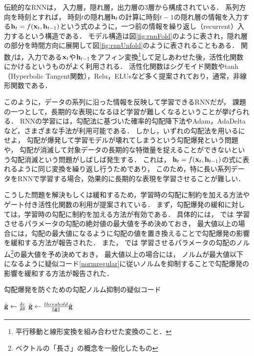 伝統的なRNNは，
入力層，隠れ層，出力層の3層から構成されている．
系列方向を時刻とすれば，
時刻$t$の隠れ層${\bf h}_t$の計算に時刻$t-1$の隠れ層の情報を入力する${\bf h}_t = f({\bf x}_t, {\bf h}_{t-1})$という式のように，一つ前の情報を繰り返し（recurrent）入力するという構造である．
モデル構造は図\ref{fig:rnnFold}のように表され，隠れ層の部分を時間方向に展開して図\ref{fig:rnnUnfold}のように表されることもある．
関数$f$は，入力である${\bf x}_t$や${\bf h}_{t-1}$をアフィン変換\footnote{平行移動と線形変換を組み合わせた変換のこと．}して足しあわせた後，活性化関数にかけるというものがよく利用される．
活性化関数はシグモイド関数やtanh（Hyperbolic Tangent関数），Relu\cite{nair2010rectified}，ELUs\cite{clevert2015fast}など多く提案されており，通常，非線形関数である．



このように，データの系列に沿った情報を反映して学習できるRNNだが，
課題の一つとして，長期的な表現になるほど学習が難しくなるということが挙げられる\cite{bengio1994learning}．
RNNの学習には，勾配法に基づいた確率的勾配降下法\cite{robbins1951stochastic,kushner2003stochastic}やAdam\cite{kingma2014adam}，AdaDelta\cite{zeiler2012adadelta}など，さまざまな手法が利用可能である．
しかし，いずれの勾配法を用いるにせよ，
勾配が爆発して学習モデルが壊れてしまうという勾配爆発\cite{bengio1994learning,pascanu2013difficulty}という問題や，
勾配が消滅して対象データの長期的な特徴量を捉えることができないという勾配消滅\cite{pascanu2013difficulty, hochreiter1998vanishing}という問題がしばしば発生する．
これは，
${\bf h}_t = f({\bf x}_t, {\bf h}_{t-1})$の式に表れるように同じ変換を繰り返し行うためであり，
このため，特に長い系列データをRNNで学習する場合，効果的に長期的な表現を学習させることが難しい．


こうした問題を解決もしくは緩和するため，学習時の勾配に制約を加える方法やゲート付き活性化関数の利用が提案されている．
まず，勾配爆発の緩和に対しては，学習時の勾配に制約を加える方法が有効である．
具体的には，
\cite{mikolov2012statistical}では
学習させるパラメータの勾配の絶対値の最大値を予め決めておき，
最大値以上の場合には，勾配の最大値になるように勾配の値を置き換えることで勾配爆発の影響を緩和する方法が報告された．
また，
\cite{pascanu2013difficulty}では
学習させるパラメータの勾配のノルム\footnote{ベクトルの「長さ」の概念を一般化したもの}の最大値を予め決めておき，
最大値以上の場合には， ノルムが最大値以下になるように疑似コード\ref{normregular}に従いノルムを抑制することで勾配爆発の影響を緩和する方法が報告された．
\begin{algorithm}                      
\caption{勾配爆発を防ぐための勾配ノルム抑制の疑似コード}
\label{normregular}                          
\begin{algorithmic}                  
	\STATE $\hat{{\bf g}} \leftarrow \frac{\delta \varepsilon}{\delta {\bf \theta}}$
	\STATE $\hat{{\bf g}} \leftarrow \frac{threshold}{\Vert \hat{{\bf g}} \Vert} \hat{{\bf g}}$
	\ENDIF
\end{algorithmic}
\end{algorithm}


